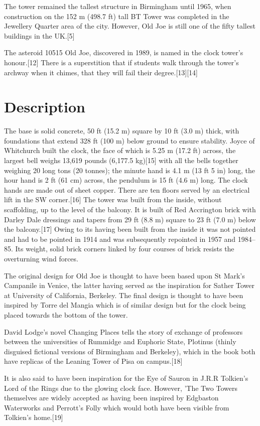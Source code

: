 The tower remained the tallest structure in Birmingham until 1965, when construction on the 152 m (498.7 ft) tall BT Tower was completed in the Jewellery Quarter area of the city. However, Old Joe is still one of the fifty tallest buildings in the UK.[5]

The asteroid 10515 Old Joe, discovered in 1989, is named in the clock tower's honour.[12] There is a superstition that if students walk through the tower's archway when it chimes, that they will fail their degree.[13][14] 

\section{Description}

The base is solid concrete, 50 ft (15.2 m) square by 10 ft (3.0 m) thick, with foundations that extend 328 ft (100 m) below ground to ensure stability. Joyce of Whitchurch built the clock, the face of which is 5.25 m (17.2 ft) across, the largest bell weighs 13,619 pounds (6,177.5 kg)[15] with all the bells together weighing 20 long tons (20 tonnes); the minute hand is 4.1 m (13 ft 5 in) long, the hour hand is 2 ft (61 cm) across, the pendulum is 15 ft (4.6 m) long. The clock hands are made out of sheet copper. There are ten floors served by an electrical lift in the SW corner.[16] The tower was built from the inside, without scaffolding, up to the level of the balcony. It is built of Red Accrington brick with Darley Dale dressings and tapers from 29 ft (8.8 m) square to 23 ft (7.0 m) below the balcony.[17] Owing to its having been built from the inside it was not pointed and had to be pointed in 1914 and was subsequently repointed in 1957 and 1984–85. Its weight, solid brick corners linked by four courses of brick resists the overturning wind forces.

The original design for Old Joe is thought to have been based upon St Mark's Campanile in Venice, the latter having served as the inspiration for Sather Tower at University of California, Berkeley. The final design is thought to have been inspired by Torre del Mangia which is of similar design but for the clock being placed towards the bottom of the tower.

David Lodge's novel Changing Places tells the story of exchange of professors between the universities of Rummidge and Euphoric State, Plotinus (thinly disguised fictional versions of Birmingham and Berkeley), which in the book both have replicas of the Leaning Tower of Pisa on campus.[18]

It is also said to have been inspiration for the Eye of Sauron in J.R.R Tolkien's Lord of the Rings due to the glowing clock face. However, 'The Two Towers themselves are widely accepted as having been inspired by Edgbaston Waterworks and Perrott's Folly which would both have been visible from Tolkien's home.[19] 